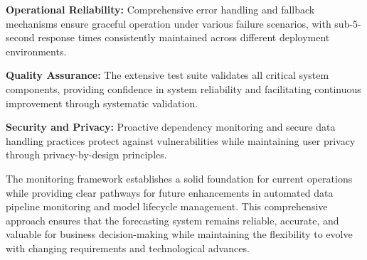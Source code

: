 \textbf{Operational Reliability:} Comprehensive error handling and fallback mechanisms ensure graceful operation under various failure scenarios, with sub-5-second response times consistently maintained across different deployment environments.

\textbf{Quality Assurance:} The extensive test suite validates all critical system components, providing confidence in system reliability and facilitating continuous improvement through systematic validation.

\textbf{Security and Privacy:} Proactive dependency monitoring and secure data handling practices protect against vulnerabilities while maintaining user privacy through privacy-by-design principles.

The monitoring framework establishes a solid foundation for current operations while providing clear pathways for future enhancements in automated data pipeline monitoring and model lifecycle management. This comprehensive approach ensures that the forecasting system remains reliable, accurate, and valuable for business decision-making while maintaining the flexibility to evolve with changing requirements and technological advances.
